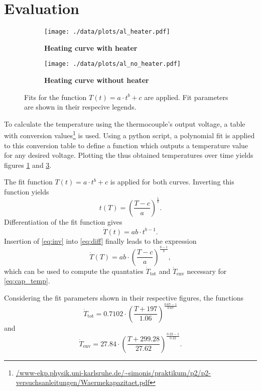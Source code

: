 \section{Evaluation}
\begin{figure}[tbp]
	\centering
	\begin{subfigure}{.45\textwidth}
		\centering
		\texttt{[image: ./data/plots/al\_heater.pdf]}
		\caption[Heating curve with heater]{\textbf{Heating curve with heater}}
		\label{fig:heater}
	\end{subfigure}
	\quad
	\begin{subfigure}{.45\textwidth}
		\centering
		\texttt{[image: ./data/plots/al\_no\_heater.pdf]}
		\caption[Heating curve without heater]{\textbf{Heating curve without heater}}
		\label{fig:no_heater}
	\end{subfigure}
	\caption[Heating curves for aluminium]{Fits for the function $T(t)=a\cdot t^b + c$ are applied. Fit parameters are shown in their respecive legends.}
\end{figure}

To calculate the temperature using the thermocouple's output voltage, a table with conversion values\footnote{\url{/www-ekp.physik.uni-karlsruhe.de/~simonis/praktikum/p2/p2-versuchsanleitungen/Waermekapazitaet.pdf}} is used.
Using a python script, a polynomial fit is applied to this conversion table to define a function which outputs a temperature value for any desired voltage.
Plotting the thus obtained temperatures over time yields figures \ref{fig:heater} and \ref{fig:no_heater}.

The fit function $T(t)=a\cdot t^b + c$ is applied for both curves.
Inverting this function yields
\begin{equation}\label{eq:inv}
	t(T) = \left(\frac{T-c}{a}\right)^\frac{1}{b}.
\end{equation}
Differentiation of the fit function gives
\begin{equation}\label{eq:diff}
	\dot{T}(t) = ab\cdot t^{b-1}.
\end{equation}
Insertion of \autoref{eq:inv} into \autoref{eq:diff} finally leads to the expression
\begin{equation}\label{eq:T_dot_of_T}
	\dot{T}(T) = ab\cdot\left(\frac{T-c}{a}\right)^{\frac{b-1}{b}},
\end{equation}
which can be used to compute the quantaties $\dot{T}_\text{tot}$ and $\dot{T}_\text{env}$ necessary for \autoref{eq:cap_temp}.

Considering the fit parameters shown in their respective figures, the functions
\begin{equation*}
	\dot{T}_\text{tot} = 0.7102\cdot\left(\frac{T+197}{1.06}\right)^{\frac{0.67-1}{0.67}}
\end{equation*}
and
\begin{equation*}
	\dot{T}_\text{env} = 27.84\cdot\left(\frac{T+299.28}{27.62}\right)^{\frac{0.22-1}{0.22}}.
\end{equation*}

